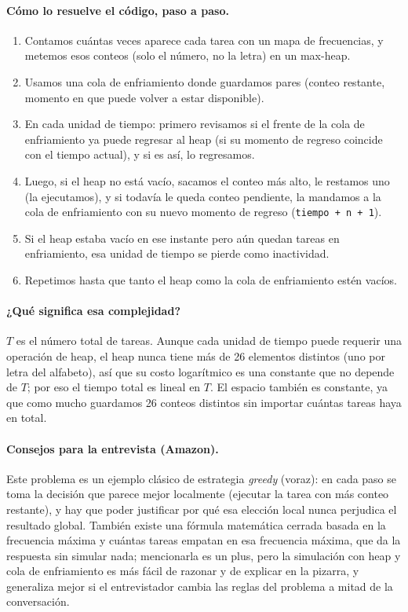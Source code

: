 \paragraph{Cómo lo resuelve el código, paso a paso.}
\begin{enumerate}
  \item Contamos cuántas veces aparece cada tarea con un mapa de
        frecuencias, y metemos esos conteos (solo el número, no la letra)
        en un max-heap.
  \item Usamos una cola de enfriamiento donde guardamos pares (conteo
        restante, momento en que puede volver a estar disponible).
  \item En cada unidad de tiempo: primero revisamos si el frente de la cola
        de enfriamiento ya puede regresar al heap (si su momento de
        regreso coincide con el tiempo actual), y si es así, lo regresamos.
  \item Luego, si el heap no está vacío, sacamos el conteo más alto, le
        restamos uno (la ejecutamos), y si todavía le queda conteo
        pendiente, la mandamos a la cola de enfriamiento con su nuevo
        momento de regreso (\texttt{tiempo + n + 1}).
  \item Si el heap estaba vacío en ese instante pero aún quedan tareas en
        enfriamiento, esa unidad de tiempo se pierde como inactividad.
  \item Repetimos hasta que tanto el heap como la cola de enfriamiento estén
        vacíos.
\end{enumerate}




\paragraph{¿Qué significa esa complejidad?} $T$ es el número total de
tareas. Aunque cada unidad de tiempo puede requerir una operación de heap,
el heap nunca tiene más de 26 elementos distintos (uno por letra del
alfabeto), así que su costo logarítmico es una constante que no depende de
$T$; por eso el tiempo total es lineal en $T$. El espacio también es
constante, ya que como mucho guardamos 26 conteos distintos sin importar
cuántas tareas haya en total.

\paragraph{Consejos para la entrevista (Amazon).} Este problema es un
ejemplo clásico de estrategia \emph{greedy} (voraz): en cada paso se toma la
decisión que parece mejor localmente (ejecutar la tarea con más conteo
restante), y hay que poder justificar por qué esa elección local nunca
perjudica el resultado global. También existe una fórmula matemática
cerrada basada en la frecuencia máxima y cuántas tareas empatan en esa
frecuencia máxima, que da la respuesta sin simular nada; mencionarla es un
plus, pero la simulación con heap y cola de enfriamiento es más fácil de
razonar y de explicar en la pizarra, y generaliza mejor si el entrevistador
cambia las reglas del problema a mitad de la conversación.

